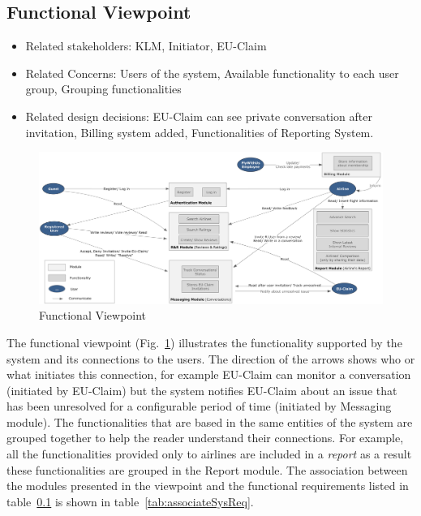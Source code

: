 % 

\subsection{Functional Viewpoint}

\begin{itemize}
\item Related stakeholders: KLM, Initiator, EU-Claim
\item Related Concerns: Users of the system, Available functionality to each user group, Grouping functionalities
\item Related design decisions: EU-Claim can see private conversation after invitation, Billing system added, Functionalities of Reporting System.
\end{itemize}

\newpage
\begin{landscape}
\begin{figure}
\includegraphics[width=600px]{Functional_Viewpoint.jpg}
\caption{Functional Viewpoint}
\label{fig:functional}
\end{figure}
\end{landscape}

The functional viewpoint (Fig.~\ref{fig:functional}) illustrates the functionality supported by the system and its connections to the users. The direction of the arrows shows who or what initiates this connection, for example EU-Claim can monitor a conversation (initiated by EU-Claim) but  the system notifies EU-Claim about an issue that has been unresolved for a configurable period of time (initiated by Messaging module). The functionalities that are based in the same entities of the system are grouped together to help the reader understand their connections. For example, all the functionalities  provided only to airlines are included in a {\em report} as a result these functionalities are grouped in the Report module. The association between the modules presented in the viewpoint and the functional requirements listed in table~\ref{} is shown in table~\ref{tab:associateSysReq}.

